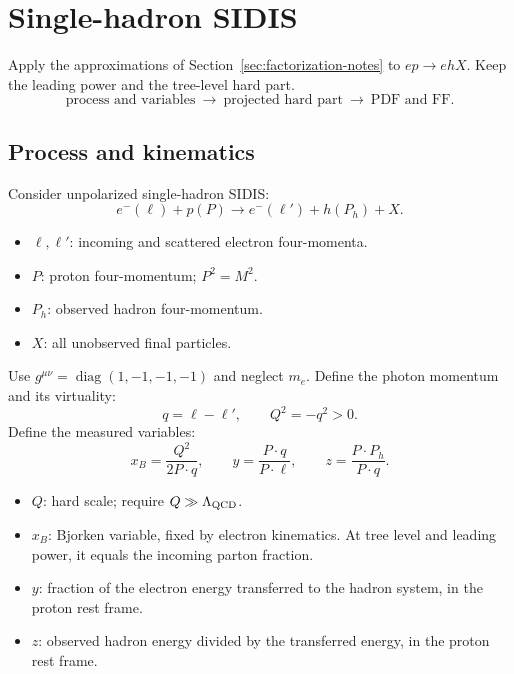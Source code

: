 \documentclass[14pt,a4paper]{extarticle}
\numberwithin{equation}{section}
\begin{document}
\clearpage
\section{Single-hadron SIDIS}
\label{sec:single-hadron}
Apply the approximations of Section~\ref{sec:factorization-notes}
to $ep\to ehX$. Keep the leading power and the tree-level hard part.
\begin{equation}
 \text{process and variables}\ \longrightarrow\
 \text{projected hard part}\ \longrightarrow\
 \text{PDF and FF}.
\end{equation}

\subsection{Process and kinematics}
\label{sec:kinematics}
Consider unpolarized single-hadron SIDIS:
\begin{equation}
 e^-(\ell)+p(P)\longrightarrow e^-(\ell')+h(P_h)+X.
 \label{eq:process}
\end{equation}
\begin{itemize}
 \item $\ell,\ell'$: incoming and scattered electron four-momenta.
 \item $P$: proton four-momentum; $P^2=M^2$.
 \item $P_h$: observed hadron four-momentum.
 \item $X$: all unobserved final particles.
\end{itemize}
Use $g^{\mu\nu}=\operatorname{diag}(1,-1,-1,-1)$ and neglect $m_e$.
Define the photon momentum and its virtuality:
\begin{equation}
 \boxed{q=\ell-\ell',\qquad Q^2=-q^2>0.}
 \label{eq:transfer}
\end{equation}
Define the measured variables:
\begin{equation}
 \boxed{x_B=\frac{Q^2}{2P\cdot q},\qquad
 y=\frac{P\cdot q}{P\cdot\ell},\qquad
 z=\frac{P\cdot P_h}{P\cdot q}.}
 \label{eq:variables}
\end{equation}
\begin{itemize}
 \item $Q$: hard scale; require $Q\gg\Lambda_{\rm QCD}$.
 \item $x_B$: Bjorken variable, fixed by electron kinematics.
 At tree level and leading power, it equals the incoming parton fraction.
 \item $y$: fraction of the electron energy transferred to the hadron system,
 in the proton rest frame.
 \item $z$: observed hadron energy divided by the transferred energy,
 in the proton rest frame.
\end{itemize}
\end{document}
